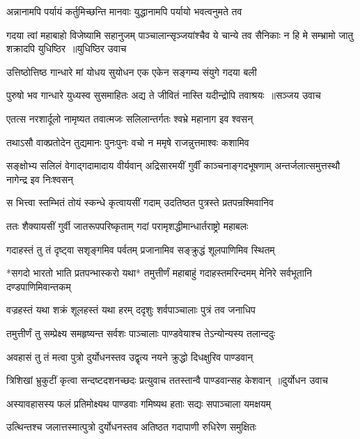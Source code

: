 \twolineshloka
{अन्नानामपि पर्यायं कर्तुमिच्छन्ति मानवाः}
{युद्धानामपि पर्यायो भवत्वनुमते तव}


\fourlineindentedshloka
{गदया त्वां महाबाहो विजेष्यामि सहानुजम्}
{पाञ्चालान्सृञ्जयांश्चैव ये चान्ये तव सैनिकाः}
{न हि मे सम्भ्रामो जातु शक्रादपि युधिष्ठिर ॥युधिष्ठिर उवाच}
{}


\twolineshloka
{उत्तिष्ठोत्तिष्ठ गान्धारे मां योधय सुयोधन}
{एक एकेन सङ्गम्य संयुगे गदया बली}


\threelineshloka
{पुरुषो भव गान्धारे युध्यस्व सुसमाहितः}
{अद्य ते जीवितं नास्ति यदीन्द्रोपि तवाश्रयः ॥सञ्जय उवाच}
{}


\twolineshloka
{एतत्स नरशार्दूलो नामृष्यत तवात्मजः}
{सलिलान्तर्गतः श्वभ्रे महानाग इव श्वसन्}


\twolineshloka
{तथाऽसौ वाक्प्रतोदेन तुद्यमानः पुनःपुनः}
{वचो न ममृषे राजन्नुत्तमाश्वः कशामिव}


\threelineshloka
{सङ्क्षोभ्य सलिलं वेगाद्गदामादाय वीर्यवान्}
{अद्रिसारमयीं गुर्वीं काञ्चनाङ्गदभूषणाम्}
{अन्तर्जलात्समुत्तस्थौ नागेन्द्र इव निःश्वसन्}


\twolineshloka
{स भित्त्वा स्तम्भितं तोयं स्कन्धे कृत्वायसीं गदाम्}
{उदतिष्ठत पुत्रस्ते प्रतपन्रश्मिवानिव}


\twolineshloka
{ततः शैक्यायसीं गुर्वी जातरूपपरिष्कृताम्}
{गदां परामृशद्धीमान्धार्तराष्ट्रो महाबलः}


\twolineshloka
{गदाहस्तं तु तं दृष्ट्वा सशृङ्गमिव पर्वतम्}
{प्रजानामिव सङ्क्रुद्धं शूलपाणिमिव स्थितम्}


*सगदो भारतो भाति प्रतपन्भास्करो यथा*
\twolineshloka
{तमुत्तीर्णं महाबाहुं गदाहस्तमरिन्दमम्}
{मेनिरे सर्वभूतानि दण्डपाणिमिवान्तकम्}


\twolineshloka
{वज्रहस्तं यथा शक्रं शूलहस्तं यथा हरम्}
{ददृशुः शर्वपाञ्चालाः पुत्रं तव जनाधिप}


\twolineshloka
{तमुत्तीर्णं तु सम्प्रेक्ष्य समहृष्यन्त सर्वशः}
{पाञ्चालाः पाण्डवेयाश्च तेऽन्योन्यस्य तलान्ददुः}


\twolineshloka
{अवहासं तु तं मत्वा पुत्रो दुर्योधनस्तव}
{उद्वृत्य नयने क्रुद्धो दिधक्षुरिव पाण्डवान्}


\threelineshloka
{त्रिशिखां भ्रुकुटीं कृत्वा सन्दष्टदशनच्छदः}
{प्रत्युवाच ततस्तान्वै पाण्डवान्सह केशवान् ॥दुर्योधन उवाच}
{}


\twolineshloka
{अस्यावहासस्य फलं प्रतिमोक्ष्यथ पाण्डवाः}
{गमिष्यथ हताः सद्यः सपाञ्चाला यमक्षयम्}


\twolineshloka
{उत्थिन्तश्च जलात्तस्मात्पुत्रो दुर्योधनस्तव}
{अतिष्ठत गदापाणी रुधिरेण समुक्षितः}



